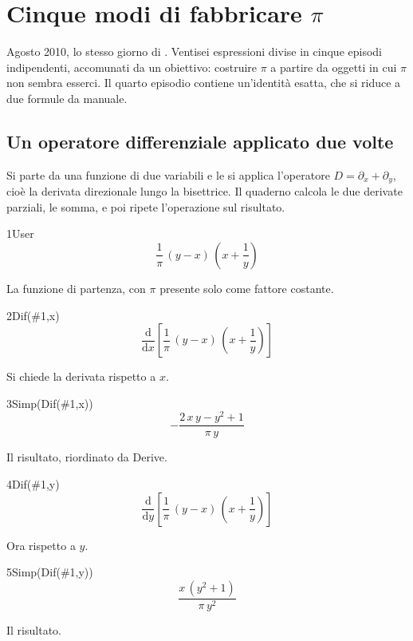 \chapter{Cinque modi di fabbricare $\pi$}
\label{cap:pigreco}

Agosto 2010, lo stesso giorno di . Ventisei espressioni divise in cinque episodi indipendenti, accomunati da un obiettivo: costruire $\pi$ a partire da oggetti in cui $\pi$ non sembra esserci. Il quarto episodio contiene un'identità esatta, che si riduce a due formule da manuale.

\section{Un operatore differenziale applicato due volte}

Si parte da una funzione di due variabili e le si applica l'operatore $D=\partial_x+\partial_y$, cioè la derivata direzionale lungo la bisettrice. Il quaderno calcola le due derivate parziali, le somma, e poi ripete l'operazione sul risultato.

\begin{espr}{1}{User}{}
\[
\frac{1}{\pi}\, \left(y - x\right)\, \left(x + \frac{1}{y}\right)
\]
\end{espr}
La funzione di partenza, con $\pi$ presente solo come fattore costante.

\begin{espr}{2}{Dif(\#1,x)}{}
\[
\frac{\mathrm{d}}{\mathrm{d}x}\!\left[\frac{1}{\pi}\, \left(y - x\right)\, \left(x + \frac{1}{y}\right)\right]
\]
\end{espr}
Si chiede la derivata rispetto a $x$.

\begin{espr}{3}{Simp(Dif(\#1,x))}{}
\[
-\frac{2\, x\, y - y^{2} + 1}{\pi\, y}
\]
\end{espr}
Il risultato, riordinato da Derive.

\begin{espr}{4}{Dif(\#1,y)}{}
\[
\frac{\mathrm{d}}{\mathrm{d}y}\!\left[\frac{1}{\pi}\, \left(y - x\right)\, \left(x + \frac{1}{y}\right)\right]
\]
\end{espr}
Ora rispetto a $y$.

\begin{espr}{5}{Simp(Dif(\#1,y))}{}
\[
\frac{x\, \left(y^{2} + 1\right)}{\pi\, y^{2}}
\]
\end{espr}
Il risultato.

